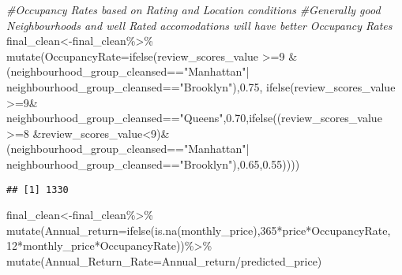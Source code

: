 \documentclass[
]{article}
\newenvironment{Shaded}{\begin{snugshade}}{\end{snugshade}}
\newcommand{\AttributeTok}[1]{\textcolor[rgb]{0.77,0.63,0.00}{#1}}
\newcommand{\CommentTok}[1]{\textcolor[rgb]{0.56,0.35,0.01}{\textit{#1}}}
\newcommand{\DecValTok}[1]{\textcolor[rgb]{0.00,0.00,0.81}{#1}}
\newcommand{\FloatTok}[1]{\textcolor[rgb]{0.00,0.00,0.81}{#1}}
\newcommand{\FunctionTok}[1]{\textcolor[rgb]{0.00,0.00,0.00}{#1}}
\newcommand{\NormalTok}[1]{#1}
\newcommand{\OtherTok}[1]{\textcolor[rgb]{0.56,0.35,0.01}{#1}}
\newcommand{\SpecialCharTok}[1]{\textcolor[rgb]{0.00,0.00,0.00}{#1}}
\newcommand{\StringTok}[1]{\textcolor[rgb]{0.31,0.60,0.02}{#1}}
\begin{document}
\begin{Shaded}
\begin{Highlighting}[]
\CommentTok{\#Occupancy Rates based on Rating and Location conditions}
\CommentTok{\#Generally good Neighbourhoods and well Rated accomodations will have better Occupancy Rates}
\NormalTok{final\_clean}\OtherTok{\textless{}{-}}\NormalTok{final\_clean}\SpecialCharTok{\%\textgreater{}\%}
  \FunctionTok{mutate}\NormalTok{(}\AttributeTok{OccupancyRate=}\FunctionTok{ifelse}\NormalTok{(review\_scores\_value }\SpecialCharTok{\textgreater{}=}\DecValTok{9} \SpecialCharTok{\&}
\NormalTok{                                (neighbourhood\_group\_cleansed}\SpecialCharTok{==}\StringTok{"Manhattan"}\SpecialCharTok{|}
\NormalTok{                                   neighbourhood\_group\_cleansed}\SpecialCharTok{==}\StringTok{"Brooklyn"}\NormalTok{),}\FloatTok{0.75}\NormalTok{,}
                              \FunctionTok{ifelse}\NormalTok{(review\_scores\_value }\SpecialCharTok{\textgreater{}=}\DecValTok{9}\SpecialCharTok{\&}
\NormalTok{                                neighbourhood\_group\_cleansed}\SpecialCharTok{==}\StringTok{"Queens"}\NormalTok{,}\FloatTok{0.70}\NormalTok{,}\FunctionTok{ifelse}\NormalTok{((review\_scores\_value }\SpecialCharTok{\textgreater{}=}\DecValTok{8}  \SpecialCharTok{\&}\NormalTok{review\_scores\_value}\SpecialCharTok{\textless{}}\DecValTok{9}\NormalTok{)}\SpecialCharTok{\&}
\NormalTok{                                   (neighbourhood\_group\_cleansed}\SpecialCharTok{==}\StringTok{"Manhattan"}\SpecialCharTok{|}
\NormalTok{                                      neighbourhood\_group\_cleansed}\SpecialCharTok{==}\StringTok{"Brooklyn"}\NormalTok{),}\FloatTok{0.65}\NormalTok{,}\FloatTok{0.55}\NormalTok{))))}
\end{Highlighting}
\end{Shaded}

\begin{verbatim}
## [1] 1330
\end{verbatim}

\begin{Shaded}
\begin{Highlighting}[]
\NormalTok{final\_clean}\OtherTok{\textless{}{-}}\NormalTok{final\_clean}\SpecialCharTok{\%\textgreater{}\%}
  \FunctionTok{mutate}\NormalTok{(}\AttributeTok{Annual\_return=}\FunctionTok{ifelse}\NormalTok{(}\FunctionTok{is.na}\NormalTok{(monthly\_price),}\DecValTok{365}\SpecialCharTok{*}\NormalTok{price}\SpecialCharTok{*}\NormalTok{OccupancyRate,}
                                \DecValTok{12}\SpecialCharTok{*}\NormalTok{monthly\_price}\SpecialCharTok{*}\NormalTok{OccupancyRate))}\SpecialCharTok{\%\textgreater{}\%}
  \FunctionTok{mutate}\NormalTok{(}\AttributeTok{Annual\_Return\_Rate=}\NormalTok{Annual\_return}\SpecialCharTok{/}\NormalTok{predicted\_price)}
\end{Highlighting}
\end{Shaded}
\end{document}
